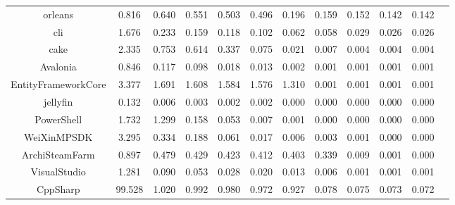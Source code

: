 \documentclass[12pt, a4paper, twoside]{report}
\begin{document}
\begin{table}[!h]
{\begin{tabular}{|c|cccccccccc|c|}
orleans	&	0.816	&	0.640	&	0.551	&	0.503	&	0.496	&	0.196	&	0.159	&	0.152	&	0.142	&	0.142	\\
cli	&	1.676	&	0.233	&	0.159	&	0.118	&	0.102	&	0.062	&	0.058	&	0.029	&	0.026	&	0.026	\\
cake	&	2.335	&	0.753	&	0.614	&	0.337	&	0.075	&	0.021	&	0.007	&	0.004	&	0.004	&	0.004	\\
Avalonia	&	0.846	&	0.117	&	0.098	&	0.018	&	0.013	&	0.002	&	0.001	&	0.001	&	0.001	&	0.001	\\
EntityFrameworkCore	&	3.377	&	1.691	&	1.608	&	1.584	&	1.576	&	1.310	&	0.001	&	0.001	&	0.001	&	0.001	\\
jellyfin	&	0.132	&	0.006	&	0.003	&	0.002	&	0.002	&	0.000	&	0.000	&	0.000	&	0.000	&	0.000	\\
PowerShell	&	1.732	&	1.299	&	0.158	&	0.053	&	0.007	&	0.001	&	0.000	&	0.000	&	0.000	&	0.000	\\
WeiXinMPSDK	&	3.295	&	0.334	&	0.188	&	0.061	&	0.017	&	0.006	&	0.003	&	0.001	&	0.000	&	0.000	\\
ArchiSteamFarm	&	0.897	&	0.479	&	0.429	&	0.423	&	0.412	&	0.403	&	0.339	&	0.009	&	0.001	&	0.000	\\
VisualStudio	&	1.281	&	0.090	&	0.053	&	0.028	&	0.020	&	0.013	&	0.006	&	0.001	&	0.001	&	0.001	\\
CppSharp	&	99.528	&	1.020	&	0.992	&	0.980	&	0.972	&	0.927	&	0.078	&	0.075	&	0.073	&	0.072	\\

\hline
\end{tabular}
}
\end{table}
\end{document}
